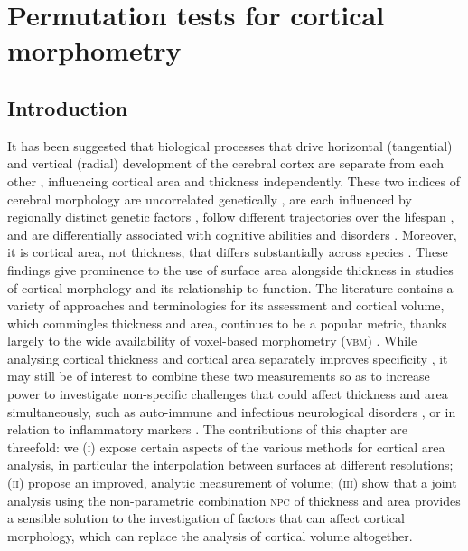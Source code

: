 \chapter{Permutation tests for cortical morphometry}
\label{sec:cortex}
\setstretch{\lspac}

\section{Introduction}
\label{sec:cortex:intro}
\setstretch{\lspac}

It has been suggested that biological processes that drive horizontal (tangential) and vertical (radial) development of the cerebral cortex are separate from each other \citep{Rakic1988,Geschwind2013}, influencing cortical area and thickness independently. These two indices of cerebral morphology are uncorrelated genetically \citep{Panizzon2009, Winkler2010}, are each influenced by regionally distinct genetic factors \citep{Schmitt2008, Rimol2010_bp, Chen2012, Chen2015}, follow different trajectories over the lifespan \citep{OLeary2007, Hogstrom2013, Fjell2015}, and are differentially associated with cognitive abilities and disorders \citep{Schnack2015, Noble2015, Lee2016, Vuoksimaa2016}. Moreover, it is cortical area, not thickness, that differs substantially across species \citep{Rakic1995}. These findings give prominence to the use of surface area alongside thickness in studies of cortical morphology and its relationship to function. The literature contains a variety of approaches and terminologies for its assessment and cortical volume, which commingles thickness and area, continues to be a popular metric, thanks largely to the wide availability of voxel-based morphometry (\textsc{vbm}) \citep{Ashburner2000, Good2001, Douaud2007}. While analysing cortical thickness and cortical area separately improves specificity \citep{Rimol2012}, it may still be of interest to combine these two measurements so as to increase power to investigate non-specific challenges that could affect thickness and area simultaneously, such as auto-immune \citep{Ceccarelli2008, Zhang2016} and infectious neurological disorders \citep{Gitelman2001, Kuper2011}, or in relation to inflammatory markers \citep{Marsland2008, Zhang2015}. The contributions of this chapter are threefold: we (\textsc{i}) expose certain aspects of the various methods for cortical area analysis, in particular the interpolation between surfaces at different resolutions; (\textsc{ii}) propose an improved, analytic measurement of volume; (\textsc{iii}) show that a joint analysis using the non-parametric combination \textsc{npc} \citep{Pesarin2010, Winkler2016_npc} of thickness and area provides a sensible solution to the investigation of factors that can affect cortical morphology, which can replace the analysis of cortical volume altogether.
 
